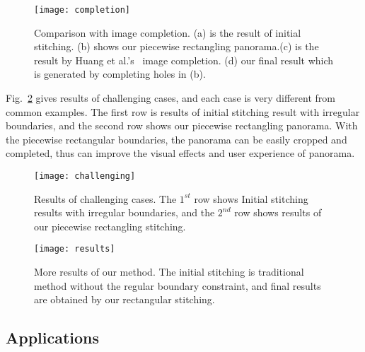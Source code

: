 \documentclass[10pt,journal,compsoc]{IEEEtran}
\begin{document}
 \begin{figure} %
  \centering
  \texttt{[image: completion]}
  \caption{Comparison with image completion. (a) is the result of initial stitching. (b) shows our piecewise rectangling panorama.(c) is the result by Huang et al.'s~\cite{journals/tog/HuangKAK14} image completion. (d) our final result which is generated by completing holes in (b). } \label{fig:completion}
\end{figure}

\begin{comment}
 \begin{figure} %
  \centering
  \texttt{[image: crop]}
  \caption{Content-ware cropping. (a) Chen et al.'s~\cite{conf/eccv/ChenC16} stitching with global prior. (b) He et al.'s~\cite{journals/tog/HeC013} rectangular stitching result.
  (c) Our piecewise rectangular stitching result.} \label{fig:crop}
\end{figure}
\end{comment}

Fig.~\ref{fig:challenging_cases} gives results of challenging cases, and each case is very different from common examples. The first row is results of initial stitching result with irregular boundaries, and the second row shows our piecewise rectangling panorama. With the piecewise rectangular boundaries, the panorama can be easily cropped and completed, thus can improve the visual effects and user experience of panorama.

 \begin{figure} %
  \centering
  \texttt{[image: challenging]}
  \caption{Results of challenging cases. The $1^{st}$ row shows Initial stitching results with irregular boundaries, and the $2^{nd}$ row shows results of our piecewise rectangling stitching.} \label{fig:challenging_cases}
\end{figure}

 \begin{figure*} %
  \centering
  \texttt{[image: results]}
  \caption{More results of our method. The initial stitching is traditional method without the regular boundary constraint, and final results are obtained by our rectangular stitching.} \label{fig:more_results}
\end{figure*}

 \subsection{Applications}
\end{document}
